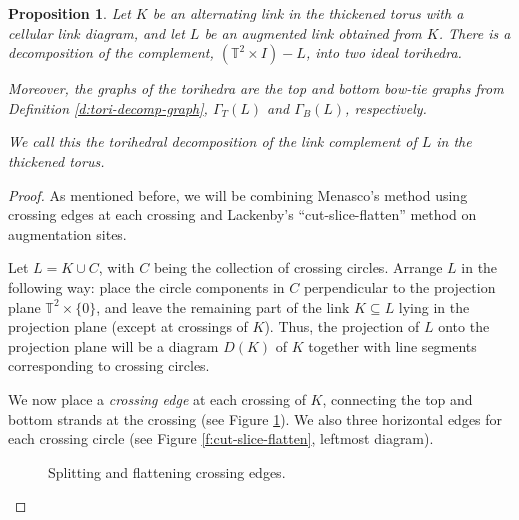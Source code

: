 \documentclass[11pt]{amsart}
\newcommand{\defref}[1]{Definition \ref{#1}}
\newcommand{\figref}[1]{Figure \ref{#1}}
\newcommand{\torus}{{\mathbb{T}^2}}
\theoremstyle{plain}
\newtheorem{prop}[theorem]{Proposition}
\theoremstyle{definition}
\begin{document}
\begin{prop}\label{p:tori_decomp}
Let $K$ be an alternating link in the thickened torus
with a cellular link diagram,
and let $L$ be an augmented link obtained from $K$.
There is a decomposition of the complement,
$(\torus \times I) - L$, into two ideal torihedra.


Moreover, the graphs of the torihedra are
the top and bottom bow-tie graphs from
\defref{d:tori-decomp-graph},
$\Gamma_T(L)$ and $\Gamma_B(L)$,
respectively.


We call this the
\emph{torihedral decomposition of
the link complement of $L$ in the thickened torus}.
\end{prop}


\begin{proof}
As mentioned before, we will be combining
Menasco's method using crossing edges at each crossing
and Lackenby's ``cut-slice-flatten'' method
on augmentation sites.


Let $L = K \cup C$, with $C$ being the collection of crossing circles.
Arrange $L$ in the following way:
place the circle components in $C$ perpendicular to
the projection plane $\torus \times \{0\}$,
and leave the remaining part of the link $K \subseteq L$
lying in the projection plane (except at crossings of $K$).
Thus, the projection of $L$ onto the projection plane
will be a diagram $D(K)$ of $K$
together with line segments corresponding to crossing circles.


We now place a \emph{crossing edge} at each crossing of $K$,
connecting the top and bottom strands at the crossing
(see \figref{f:crossing-edges}).
We also three horizontal edges for each crossing circle
(see \figref{f:cut-slice-flatten}, leftmost diagram).

\begin{figure} 

\label{f:crossing-edges}
\caption{Splitting and flattening crossing edges.}
\end{figure}



\end{proof}
\end{document}
